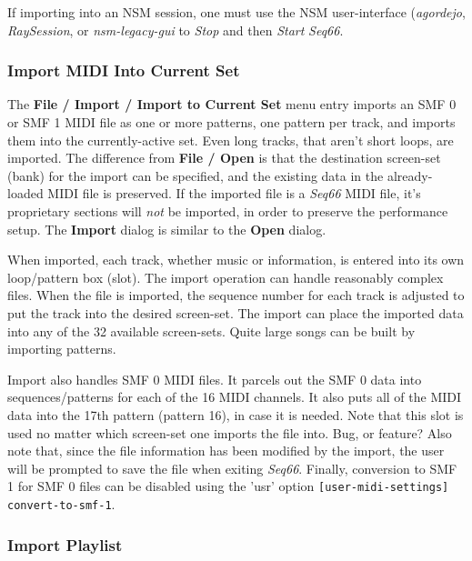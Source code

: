    If importing into an NSM session, one must use the NSM user-interface
   (\textsl{agordejo}, \textsl{RaySession}, or \textsl{nsm-legacy-gui}
   to \textsl{Stop} and then \textsl{Start} \textsl{Seq66}.

\subsubsection{Import MIDI Into Current Set}
\label{subsubsec:midi_export_file_import}

   The \textbf{File / Import / Import to Current Set} menu entry imports an SMF 0
   or SMF 1 MIDI file as one or more patterns, one pattern per track, and
   imports them into the currently-active set.
   Even long tracks, that aren't short loops, are imported.
   The difference from \textbf{File / Open} is that the destination screen-set
   (bank) for the import can be specified, and the existing data in the
   already-loaded MIDI file is preserved.
   If the imported file is a
   \textsl{Seq66} MIDI file, it's proprietary sections will
   \textsl{not} be imported, in order to preserve the performance setup.
   The \textbf{Import} dialog is similar to the \textbf{Open} dialog.

   When imported, each track, whether music or information,
   is entered into its own loop/pattern box (slot).
   The import operation can handle reasonably complex files.
   When the file is imported, the sequence number for each track is
   adjusted to put the track into the desired screen-set.
   The import can place the imported data into any of the 32 available
   screen-sets.  Quite large songs can be built by importing patterns.

   Import also handles SMF 0 MIDI files.  It parcels out the SMF 0 data
   into sequences/patterns for each of the 16 MIDI channels.  It also puts
   all of the MIDI data into the 17th pattern (pattern 16), in case it is
   needed.  Note that this slot is used no matter which screen-set one imports
   the file into.  Bug, or feature?
   Also note that, since the file information has been modified by the import,
   the user will be prompted to save the file when exiting \textsl{Seq66}.
   Finally, conversion to SMF 1 for SMF 0 files can be disabled using the
   'usr' option \texttt{[user-midi-settings] convert-to-smf-1}.

\subsubsection{Import Playlist}
\label{subsubsec:midi_export_file_import_playlist}

